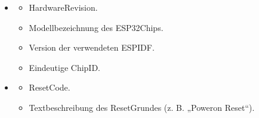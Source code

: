 \documentclass[letterpaper,10pt,english]{sphinxmanual}
\begin{document}
\begin{itemize}
\begin{description}
\begin{itemize}
\item {} 
\sphinxAtStartPar
{}  \textendash{} Betriebsmodus des Flash (z. B. QIO/DIO).

\item {} 
\sphinxAtStartPar
{}  \textendash{} Taktfrequenz des Flash\sphinxhyphen{}Speichers.

\end{itemize}

\end{description}

\item {} \begin{description}
\begin{itemize}
\item {} 
\sphinxAtStartPar
{}  \textendash{} Hardware\sphinxhyphen{}Revision.

\item {} 
\sphinxAtStartPar
{}  \textendash{} Modellbezeichnung des ESP32\sphinxhyphen{}Chips.

\item {} 
\sphinxAtStartPar
{}  \textendash{} Version der verwendeten ESP\sphinxhyphen{}IDF.

\item {} 
\sphinxAtStartPar
{}  \textendash{} Eindeutige Chip\sphinxhyphen{}ID.

\end{itemize}

\end{description}

\item {} \begin{description}
\begin{itemize}
\item {} 
\sphinxAtStartPar
{}  \textendash{} Reset\sphinxhyphen{}Code.

\item {} 
\sphinxAtStartPar
{}  \textendash{} Textbeschreibung des Reset\sphinxhyphen{}Grundes (z. B. „Power\sphinxhyphen{}on Reset“).

\end{itemize}

\end{description}

\end{itemize}
\end{document}

